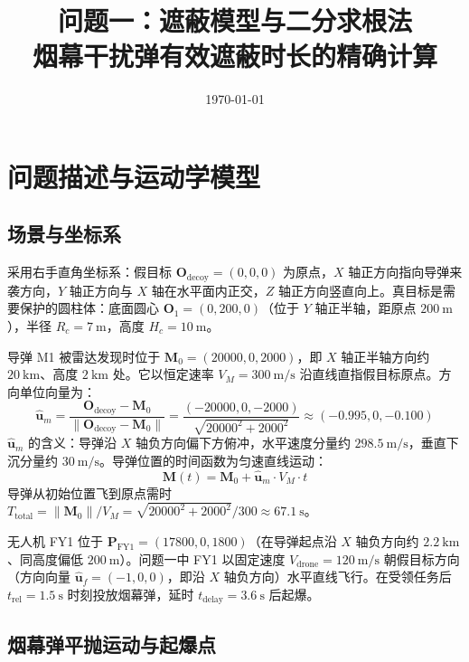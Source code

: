 \documentclass[12pt,a4paper]{ctexart}
\title{\textbf{问题一：遮蔽模型与二分求根法}\\[5pt]
       \large 烟幕干扰弹有效遮蔽时长的精确计算}
\author{}
\date{\today}
\begin{document}
\maketitle

\section{问题描述与运动学模型}

\subsection{场景与坐标系}

采用右手直角坐标系：假目标 $\mathbf{O}_{\text{decoy}} = (0,0,0)$ 为原点，$X$ 轴正方向指向导弹来袭方向，$Y$ 轴正方向与 $X$ 轴在水平面内正交，$Z$ 轴正方向竖直向上。真目标是需要保护的圆柱体：底面圆心 $\mathbf{O}_1 = (0, 200, 0)$（位于 $Y$ 轴正半轴，距原点 $200\ \mathrm{m}$），半径 $R_c = 7\ \mathrm{m}$，高度 $H_c = 10\ \mathrm{m}$。

导弹 M1 被雷达发现时位于 $\mathbf{M}_0 = (20000, 0, 2000)$，即 $X$ 轴正半轴方向约 $20\ \mathrm{km}$、高度 $2\ \mathrm{km}$ 处。它以恒定速率 $V_M = 300\ \mathrm{m/s}$ 沿直线直指假目标原点。方向单位向量为：
\begin{equation}
\hat{\mathbf{u}}_m = \frac{\mathbf{O}_{\text{decoy}} - \mathbf{M}_0}{\|\mathbf{O}_{\text{decoy}} - \mathbf{M}_0\|}
= \frac{(-20000, 0, -2000)}{\sqrt{20000^2 + 2000^2}} \approx (-0.995, 0, -0.100)
\end{equation}
$\hat{\mathbf{u}}_m$ 的含义：导弹沿 $X$ 轴负方向偏下方俯冲，水平速度分量约 $298.5\ \mathrm{m/s}$，垂直下沉分量约 $30\ \mathrm{m/s}$。导弹位置的时间函数为匀速直线运动：
\begin{equation}
\boxed{\mathbf{M}(t) = \mathbf{M}_0 + \hat{\mathbf{u}}_m \cdot V_M \cdot t}
\end{equation}
导弹从初始位置飞到原点需时 $T_{\text{total}} = \|\mathbf{M}_0\| / V_M = \sqrt{20000^2 + 2000^2}/300 \approx 67.1\ \mathrm{s}$。

无人机 FY1 位于 $\mathbf{P}_{\text{FY1}} = (17800, 0, 1800)$（在导弹起点沿 $X$ 轴负方向约 $2.2\ \mathrm{km}$、同高度偏低 $200\ \mathrm{m}$）。问题一中 FY1 以固定速度 $V_{\text{drone}} = 120\ \mathrm{m/s}$ 朝假目标方向（方向向量 $\hat{\mathbf{u}}_f = (-1, 0, 0)$，即沿 $X$ 轴负方向）水平直线飞行。在受领任务后 $t_{\text{rel}} = 1.5\ \mathrm{s}$ 时刻投放烟幕弹，延时 $t_{\text{delay}} = 3.6\ \mathrm{s}$ 后起爆。

\subsection{烟幕弹平抛运动与起爆点}
\end{document}
